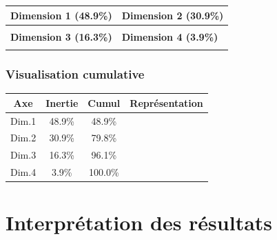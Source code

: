 \documentclass[12pt,a4paper]{book}
\begin{document}
	\begin{center}
		\begin{tabular}{p{5cm}p{8cm}}
			\toprule
			\textbf{Dimension 1 (48.9\%)} & \textbf{Dimension 2 (30.9\%)} \\
			\midrule
			\colorbox{blue!80}{\rule{0pt}{0.8cm}\hspace{4.9cm}} & 
			\colorbox{blue!60}{\rule{0pt}{0.8cm}\hspace{3.1cm}} \\
			\midrule
			\textbf{Dimension 3 (16.3\%)} & \textbf{Dimension 4 (3.9\%)} \\
			\midrule
			\colorbox{orange!40}{\rule{0pt}{0.8cm}\hspace{1.6cm}} & 
			\colorbox{red!30}{\rule{0pt}{0.8cm}\hspace{0.4cm}} \\
			\bottomrule
		\end{tabular}
	\end{center}
	
	\subsubsection{Visualisation cumulative}
	
	\begin{center}
		\begin{tabular}{cccc}
			\toprule
			\textbf{Axe} & \textbf{Inertie} & \textbf{Cumul} & \textbf{Représentation} \\
			\midrule
			Dim.1 & 48.9\% & 48.9\% & \colorbox{blue!50}{\rule{0pt}{0.4cm}\hspace{4.9cm}} \\
			Dim.2 & 30.9\% & 79.8\% & \colorbox{blue!40}{\rule{0pt}{0.4cm}\hspace{3.1cm}} \\
			Dim.3 & 16.3\% & 96.1\% & \colorbox{orange!30}{\rule{0pt}{0.4cm}\hspace{1.6cm}} \\
			Dim.4 & 3.9\% & 100.0\% & \colorbox{red!20}{\rule{0pt}{0.4cm}\hspace{0.4cm}} \\
			\bottomrule
		\end{tabular}
	\end{center}
	
	\section{Interprétation des résultats}
	
\end{document}
